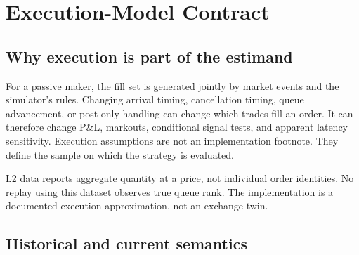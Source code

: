 \section{Execution-Model Contract}

\subsection{Why execution is part of the estimand}

For a passive maker, the fill set is generated jointly by market events and the
simulator's rules. Changing arrival timing, cancellation timing, queue
advancement, or post-only handling can change which trades fill an order. It can
therefore change P\&L, markouts, conditional signal tests, and apparent latency
sensitivity. Execution assumptions are not an implementation footnote. They
define the sample on which the strategy is evaluated.

L2 data reports aggregate quantity at a price, not individual order identities.
No replay using this dataset observes true queue rank. The implementation is a
documented execution approximation, not an exchange twin.

\subsection{Historical and current semantics}

